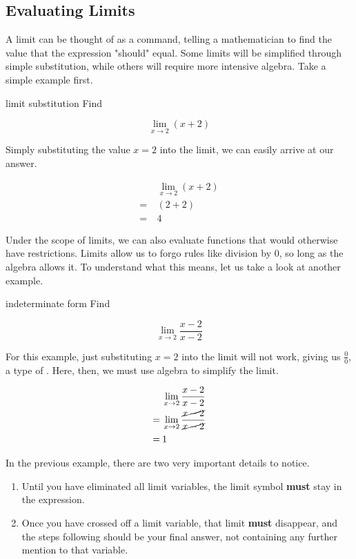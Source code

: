 \subsection{Evaluating Limits}

A limit can be thought of as a command, telling a mathematician to find the value that the expression "should" equal. Some limits will be simplified through simple substitution, while others will require more intensive algebra. Take a simple example first.

\begin{example}{limit substitution}
    Find
    
    \[ \lim_{x \to 2} \left( x + 2 \right) \]
    
    Simply substituting the value \( x = 2 \) into the limit, we can easily arrive at our answer.
    
    \begin{align}
        & \lim_{x \to 2} \left( x + 2 \right) \\
        = \> &\left( 2 + 2 \right) \\
        = \> &4
    \end{align}
\end{example}

Under the scope of limits, we can also evaluate functions that would otherwise have restrictions. Limits allow us to forgo rules like division by \( 0 \), so long as the algebra allows it. To understand what this means, let us take a look at another example.

\begin{example}{indeterminate form}
    Find
    
    \[ \lim_{x \to 2} \dfrac{x - 2}{x - 2} \]
    
    For this example, just substituting \( x = 2 \) into the limit will not work, giving us \( \frac{0}{0} \), a type of . Here, then, we must use algebra to simplify the limit.
    
    \begin{align}
        &\lim_{x \to 2} \dfrac{x - 2}{x - 2} \\
        = \> &\lim_{x \to 2} \dfrac{\cancel{x - 2}}{\cancel{x - 2}} \\
        = \> &1
    \end{align}
\end{example}

\begin{tip}
    In the previous example, there are two very important details to notice.
    
    \begin{enumerate}
        \item Until you have eliminated all limit variables, the limit symbol \textbf{must} stay in the expression.
        \item Once you have crossed off a limit variable, that limit \textbf{must} disappear, and the steps following should be your final answer, not containing any further mention to that variable.
    \end{enumerate}
\end{tip}

